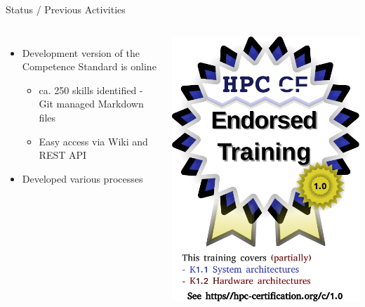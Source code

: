 \documentclass[compress,aspectratio=169]{beamer}
\begin{document}
\begin{frame}{Status / Previous Activities}
\begin{columns}
\vspace*{-1cm}
	\begin{itemize}  
	\item Development version of the Competence Standard is online
    \begin{itemize}
      \item ca. 250 skills identified - Git managed Markdown files
      \item Easy access via Wiki and REST API
    \end{itemize}
  \item Developed various processes
\end{itemize}

\includegraphics[width=\textwidth]{certified.pdf}
\end{columns}


\end{frame}
\end{document}
